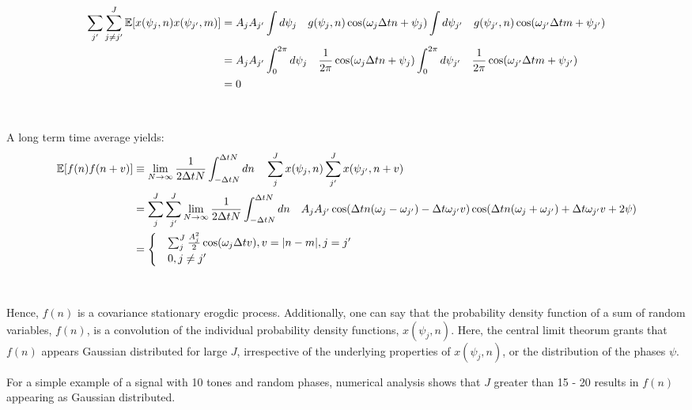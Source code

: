 \begin{align}
\sum_{j'}\sum_{j\neq j'}^J \mathbb{E}[x(\psi_j, n) x(\psi_{j'}, m)] & = A_j A_{j'} \int d \psi_j \quad g(\psi_j, n) \cos(\omega_j \Delta t n + \psi_j) \int d \psi_{j'} \quad g(\psi_{j'}, n) \cos(\omega_{j'} \Delta t m + \psi_{j'}) \\
& = A_j A_{j'} \int_0^{2\pi} d \psi_j \quad \frac{1}{2\pi} \cos(\omega_j \Delta t n + \psi_j) \int_0^{2\pi} d \psi_{j'} \quad \frac{1}{2\pi}  \cos(\omega_{j'} \Delta t m + \psi_{j'}) \\
& = 0 
\end{align}
 \\
 \\
  A long term time average yields:
\begin{align}
\mathbb{E}[f(n)f(n + v)] & \equiv \lim_{N \to \infty} \frac{1}{2 \Delta t N} \int_{-\Delta t N}^{\Delta t N} dn \quad  \sum_j^J x(\psi_j, n) \sum_{j'}^{J} x(\psi_{j'}, n + v) \\
&= \sum_j^J  \sum_{j'}^{J} \lim_{N \to \infty} \frac{1}{2 \Delta t N} \int_{-\Delta t N}^{\Delta t N} dn \quad   A_j A_{j'} \cos (\Delta t n(\omega_j - \omega_{j'}) - \Delta t \omega_{j'} v)  \cos (\Delta t n(\omega_j + \omega_{j'}) + \Delta t \omega_{j'} v + 2\psi)\\
&= \begin{cases}
& \sum_j^J \frac{A_j^2}{2} \cos(\omega_j \Delta t v), v = |n - m |, j = j' \\
& 0, j \neq j'
\end{cases}
\end{align}
\\
\\
Hence, $f(n)$ is a covariance stationary erogdic process. Additionally, one can say that the probability density function of a sum of random variables, $f(n)$, is a convolution of the individual probability density functions,   $x(\psi_j, n)$. Here, the central limit theorum grants that $f(n)$ appears Gaussian distributed for large $J$, irrespective of the underlying properties of $x(\psi_j, n)$, or the distribution of the phases $\psi$. 

For a simple example of a signal with 10 tones and random phases, numerical analysis shows that $J$ greater than 15 - 20 results in $f(n)$ appearing as Gaussian distributed. 

